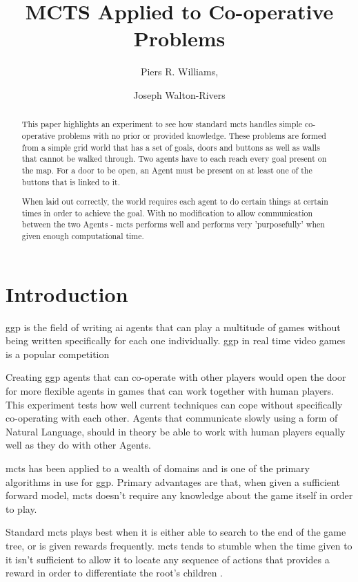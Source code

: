 \documentclass{IEEEtran}
\author{Piers R. Williams, \and Joseph Walton-Rivers}
\title{MCTS Applied to Co-operative Problems}
\begin{document}
\maketitle
\begin{abstract}
This paper highlights an experiment to see how standard \gls{mcts} handles simple co-operative problems with no prior or provided knowledge.	These problems are formed from a simple grid world that has a set of goals, doors and buttons as well as walls that cannot be walked through. Two agents have to each reach every goal present on the map. For a door to be open, an Agent must be present on at least one of the buttons that is linked to it.

When laid out correctly, the world requires each agent to do certain things at certain times in order to achieve the goal. With no modification to allow communication between the two Agents - \gls{mcts} performs well and performs very 'purposefully' when given enough computational time.
\end{abstract}

\section{Introduction}
\gls{ggp} is the field of writing \gls{ai} agents that can play a multitude of games without being written specifically for each one individually. \gls{ggp} in real time video games is a popular competition \cite{perez2014}

Creating \gls{ggp} agents that can co-operate with other players would open the door for more flexible agents in games that can work together with human players. This experiment tests how well current techniques can cope without specifically co-operating with each other. Agents that communicate slowly using a form of Natural Language, should in theory be able to work with human players equally well as they do with other Agents.

\gls{mcts} \cite{browne2012survey} has been applied to a wealth of domains and is one of the primary algorithms in use for \gls{ggp}\cite{finnsson2008simulation}. Primary advantages are that, when given a sufficient forward model, \gls{mcts} doesn't require any knowledge about the game itself in order to play.

Standard \gls{mcts} plays best when it is either able to search to the end of the game tree, or is given rewards frequently. \gls{mcts} tends to stumble when the time given to it isn't sufficient to allow it to locate any sequence of actions that provides a reward in order to differentiate the root's children \cite{perez2012monte}.
\end{document}
